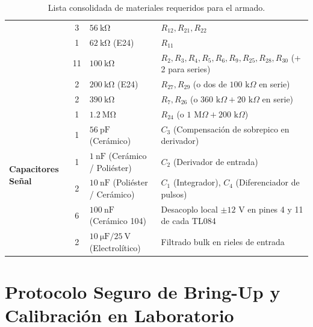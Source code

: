 \documentclass[10pt, a4paper]{article}
\begin{document}
\begin{table}[H]
\begin{tabularx}{\textwidth}{l c l X}
& 3 & $\SI{56}{\kilo\ohm}$ & $R_{12}, R_{21}, R_{22}$ \\
& 1 & $\SI{62}{\kilo\ohm}$ (E24) & $R_{11}$ \\
& 11 & $\SI{100}{\kilo\ohm}$ & $R_2, R_3, R_4, R_5, R_6, R_9, R_{25}, R_{28}, R_{30}$ (+ 2 para series) \\
& 2 & $\SI{200}{\kilo\ohm}$ (E24) & $R_{27}, R_{29}$ (o dos de $100\text{ k}\Omega$ en serie) \\
& 2 & $\SI{390}{\kilo\ohm}$ & $R_7, R_{26}$ (o $360\text{ k}\Omega + 20\text{ k}\Omega$ en serie) \\
& 1 & $\SI{1.2}{\mega\ohm}$ & $R_{24}$ (o $1\text{ M}\Omega + 200\text{ k}\Omega$) \\
\midrule
\multirow{4}{*}{\textbf{Capacitores Señal}}
& 1 & $\SI{56}{\pico\farad}$ (Cerámico) & $C_3$ (Compensación de sobrepico en derivador) \\
& 1 & $\SI{1}{\nano\farad}$ (Cerámico / Poliéster) & $C_2$ (Derivador de entrada) \\
& 2 & $\SI{10}{\nano\farad}$ (Poliéster / Cerámico) & $C_1$ (Integrador), $C_4$ (Diferenciador de pulsos) \\
\midrule
\multirow{2}{*}{\textbf{Capacitores Desacoplo}}
& 6 & $\SI{100}{\nano\farad}$ (Cerámico 104) & Desacoplo local $\pm 12\text{ V}$ en pines 4 y 11 de cada TL084 \\
& 2 & $\SI{10}{\micro\farad} / \SI{25}{\volt}$ (Electrolítico) & Filtrado bulk en rieles de entrada \\
\bottomrule
\end{tabularx}
\caption{Lista consolidada de materiales requeridos para el armado.}
\end{table}

\newpage

\section{Protocolo Seguro de Bring-Up y Calibración en Laboratorio}
\end{document}
